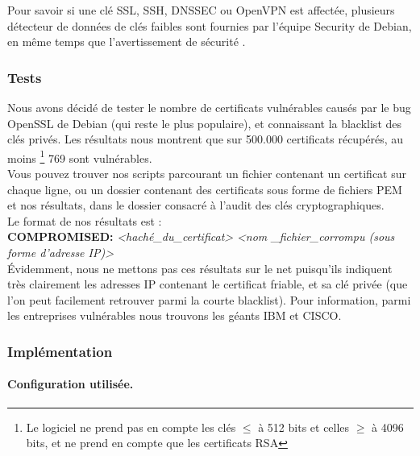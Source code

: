 			Pour savoir si une clé SSL, SSH, DNSSEC ou OpenVPN est affectée, 
			plusieurs détecteur de données \cite{dowkd.pl} 
			\cite{openssl-blacklist} de clés faibles sont 
			fournies par l'équipe Security de Debian, en même temps que
			l'avertissement de sécurité \cite{debian2008bug}.\\ 
	
		\subsubsection{Tests}
	
			Nous avons décidé de tester le nombre de certificats vulnérables 
			causés 	par le bug OpenSSL de Debian (qui reste le plus populaire), et
			connaissant la blacklist des clés privés.
			Les résultats nous montrent que sur 500.000 certificats récupérés, au moins
			\footnote{Le logiciel ne prend pas en compte les clés $\leq$ à 512 bits et 
			celles $\geq$ à 4096 bits, et ne prend en compte que les certificats RSA} 
			769 sont vulnérables.\\
			
			Vous pouvez trouver nos scripts parcourant un fichier contenant un 
			certificat sur chaque ligne, ou un dossier contenant des certificats sous 
			forme de fichiers PEM et nos résultats, dans le dossier consacré à l'audit des clés
			cryptographiques.\\
			
			Le format de nos résultats est : \\
			
			\textbf{COMPROMISED:} \textit{<haché\_du\_certificat>} \textit{<nom
			\_fichier\_corrompu (sous forme d'adresse IP)>}\\
			
			Évidemment, nous ne mettons pas ces résultats sur le net puisqu'ils indiquent
			très clairement les adresses IP contenant le certificat friable, et sa clé
			privée (que l'on peut facilement retrouver parmi la courte blacklist).
			Pour information, parmi les entreprises vulnérables nous trouvons les géants
			IBM et CISCO.
	
		\subsubsection{Implémentation}
						
			\paragraph{Configuration utilisée.\\}
			
